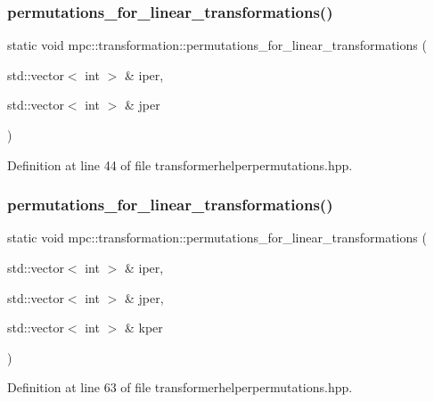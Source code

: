 \subsubsection{\texorpdfstring{permutations\+\_\+for\+\_\+linear\+\_\+transformations()}{permutations\_for\_linear\_transformations()}\hspace{0.1cm}{\footnotesize\ttfamily [2/11]}}
{\footnotesize\ttfamily static void mpc\+::transformation\+::permutations\+\_\+for\+\_\+linear\+\_\+transformations (\begin{DoxyParamCaption}\item[{std\+::vector$<$ int $>$ \&}]{iper,  }\item[{std\+::vector$<$ int $>$ \&}]{jper }\end{DoxyParamCaption})\hspace{0.3cm}{\ttfamily [static]}}



Definition at line 44 of file transformerhelperpermutations.\+hpp.

\mbox{\label{namespacempc_1_1transformation_a6d9e9faa8600ee2e18d4a42b5d5cd4ef}} 
\subsubsection{\texorpdfstring{permutations\+\_\+for\+\_\+linear\+\_\+transformations()}{permutations\_for\_linear\_transformations()}\hspace{0.1cm}{\footnotesize\ttfamily [3/11]}}
{\footnotesize\ttfamily static void mpc\+::transformation\+::permutations\+\_\+for\+\_\+linear\+\_\+transformations (\begin{DoxyParamCaption}\item[{std\+::vector$<$ int $>$ \&}]{iper,  }\item[{std\+::vector$<$ int $>$ \&}]{jper,  }\item[{std\+::vector$<$ int $>$ \&}]{kper }\end{DoxyParamCaption})\hspace{0.3cm}{\ttfamily [static]}}



Definition at line 63 of file transformerhelperpermutations.\+hpp.

